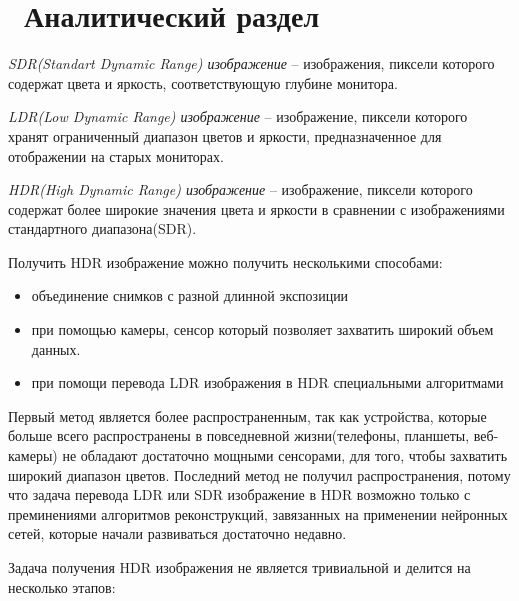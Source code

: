 \chapter{ Аналитический раздел}
\label{cha:analysis}

\textit{SDR(Standart Dynamic Range) изображение} -- изображения, пиксели которого содержат цвета и яркость, соответствующую глубине монитора.

\textit{LDR(Low Dynamic Range) изображение} -- изображение, пиксели которого хранят ограниченный диапазон цветов и яркости, предназначенное для отображении на старых мониторах.

\textit{HDR(High Dynamic Range) изображение} -- изображение, пиксели которого содержат более широкие значения цвета и яркости в сравнении с изображениями стандартного диапазона(SDR).

Получить HDR изображение можно получить несколькими способами: 
\begin{itemize}
    \item объединение снимков с разной длинной экспозиции
    \item при помощью камеры, сенсор который позволяет захватить широкий объем данных. 
    \item при помощи перевода LDR изображения в HDR специальными алгоритмами
\end{itemize}

Первый метод является более распространенным, так как устройства, которые больше всего распространены в повседневной жизни(телефоны, планшеты, веб-камеры) не обладают достаточно мощными сенсорами, для того, чтобы захватить широкий диапазон цветов. Последний метод не получил распространения, потому что задача перевода LDR или SDR изображение в HDR возможно только с преминениями алгоритмов реконструкций, завязанных на применении нейронных сетей, которые начали развиваться достаточно недавно.

Задача получения HDR изображения не является тривиальной и делится на несколько этапов:
\begin{itemize}
\end{itemize}
